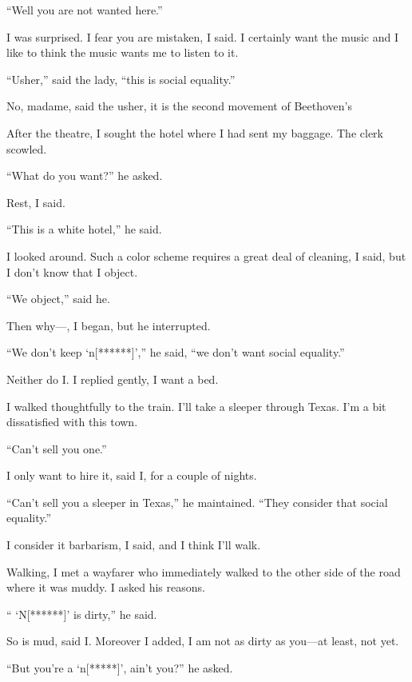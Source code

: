 \documentclass[letterpaper,10pt,english]{jupyterBook}
\begin{document}
\sphinxAtStartPar
“Well you are not wanted here.”

\sphinxAtStartPar
I was surprised. I fear you are mistaken, I said. I certainly want the music and I like to think the music wants me to listen to it.

\sphinxAtStartPar
“Usher,” said the lady, “this is social equality.”

\sphinxAtStartPar
No, madame, said the usher, it is the second movement of Beethoven’s

\sphinxAtStartPar
After the theatre, I sought the hotel where I had sent my baggage. The clerk scowled.

\sphinxAtStartPar
“What do you want?” he asked.

\sphinxAtStartPar
Rest, I said.

\sphinxAtStartPar
“This is a white hotel,” he said.

\sphinxAtStartPar
I looked around. Such a color scheme requires a great deal of cleaning, I said, but I don’t know that I object.

\sphinxAtStartPar
“We object,” said he.

\sphinxAtStartPar
Then why—, I began, but he interrupted.

\sphinxAtStartPar
“We don’t keep ‘n{[}******{]}’,” he said, “we don’t want social equality.”

\sphinxAtStartPar
Neither do I. I replied gently, I want a bed.

\sphinxAtStartPar
I walked thoughtfully to the train. I’ll take a sleeper through Texas. I’m a bit dissatisfied with this town.

\sphinxAtStartPar
“Can’t sell you one.”

\sphinxAtStartPar
I only want to hire it, said I, for a couple of nights.

\sphinxAtStartPar
“Can’t sell you a sleeper in Texas,” he maintained. “They consider that social equality.”

\sphinxAtStartPar
I consider it barbarism, I said, and I think I’ll walk.

\sphinxAtStartPar
Walking, I met a wayfarer who immediately walked to the other side of the road where it was muddy. I asked his reasons.

\sphinxAtStartPar
“ ‘N{[}******{]}’ is dirty,” he said.

\sphinxAtStartPar
So is mud, said I. Moreover I added, I am not as dirty as you—at least, not yet.

\sphinxAtStartPar
“But you’re a ‘n{[}*****{]}’, ain’t you?” he asked.
\end{document}
